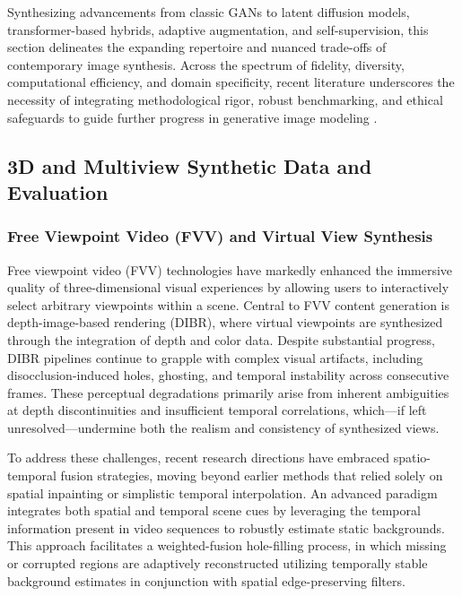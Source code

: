 \documentclass[sigconf]{acmart}
\begin{document}
Synthesizing advancements from classic GANs to latent diffusion models, transformer-based hybrids, adaptive augmentation, and self-supervision, this section delineates the expanding repertoire and nuanced trade-offs of contemporary image synthesis. Across the spectrum of fidelity, diversity, computational efficiency, and domain specificity, recent literature underscores the necessity of integrating methodological rigor, robust benchmarking, and ethical safeguards to guide further progress in generative image modeling \cite{ref1,ref2,ref3,ref5,ref6,ref10,ref12,ref13,ref14,ref15,ref16,ref18,ref21,ref22,ref23,ref24,ref25,ref26,ref29,ref30,ref32,ref54,ref55,ref60,ref61,ref62,ref64,ref65,ref66,ref70,ref73,ref74,ref76,ref79,ref81,ref83,ref85,ref89,ref90,ref91,ref92,ref93,ref94,ref95,ref96,ref97,ref100,ref101,ref102}.

\subsection{3D and Multiview Synthetic Data and Evaluation}

\subsubsection{Free Viewpoint Video (FVV) and Virtual View Synthesis}

Free viewpoint video (FVV) technologies have markedly enhanced the immersive quality of three-dimensional visual experiences by allowing users to interactively select arbitrary viewpoints within a scene. Central to FVV content generation is depth-image-based rendering (DIBR), where virtual viewpoints are synthesized through the integration of depth and color data. Despite substantial progress, DIBR pipelines continue to grapple with complex visual artifacts, including disocclusion-induced holes, ghosting, and temporal instability across consecutive frames. These perceptual degradations primarily arise from inherent ambiguities at depth discontinuities and insufficient temporal correlations, which—if left unresolved—undermine both the realism and consistency of synthesized views.

To address these challenges, recent research directions have embraced spatio-temporal fusion strategies, moving beyond earlier methods that relied solely on spatial inpainting or simplistic temporal interpolation. An advanced paradigm integrates both spatial and temporal scene cues by leveraging the temporal information present in video sequences to robustly estimate static backgrounds. This approach facilitates a weighted-fusion hole-filling process, in which missing or corrupted regions are adaptively reconstructed utilizing temporally stable background estimates in conjunction with spatial edge-preserving filters.
\end{document}
